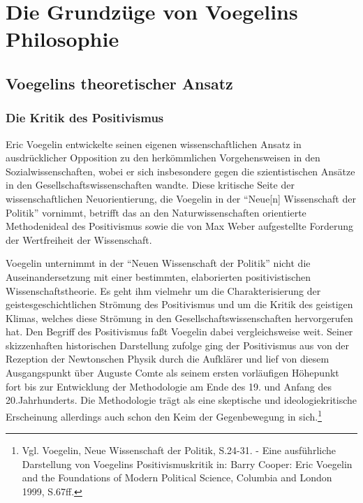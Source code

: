 

\chapter{Die Grundzüge von Voegelins Philosophie}

\section{Voegelins theoretischer Ansatz}

\subsection{Die Kritik des Positivismus}

Eric Voegelin entwickelte seinen eigenen wissenschaftlichen Ansatz in
ausdrücklicher Opposition zu den herkömmlichen Vorgehensweisen in den
Sozialwissenschaften, wobei er sich insbesondere gegen die szientistischen
Ansätze in den Gesellschaftswissenschaften wandte. Diese kritische Seite der
wissenschaftlichen Neuorientierung, die Voegelin in der "`Neue[n] Wissenschaft
der Politik"' vornimmt, betrifft das an den Naturwissenschaften orientierte
Methodenideal des Positivismus sowie die von Max Weber aufgestellte Forderung
der Wertfreiheit der Wissenschaft.

Voegelin unternimmt in der "`Neuen Wissenschaft der Politik"' nicht die
Auseinandersetzung mit einer bestimmten, elaborierten positivistischen
Wissenschaftstheorie. Es geht ihm vielmehr um die Charakterisierung der
geistesgeschichtlichen Strömung des Positivismus und um die Kritik des
geistigen Klimas, welches diese Strömung in den Gesellschaftswissenschaften
hervorgerufen hat. Den Begriff des Positivismus faßt Voegelin dabei
vergleichsweise weit. Seiner skizzenhaften historischen Darstellung zufolge
ging der Positivismus aus von der Rezeption der Newtonschen Physik durch die
Aufklärer und lief von diesem Ausgangspunkt über Auguste Comte als seinem
ersten vorläufigen Höhepunkt fort bis zur Entwicklung der Methodologie am Ende
des 19. und Anfang des 20.Jahrhunderts. Die Methodologie trägt als eine
skeptische und ideologiekritische Erscheinung allerdings auch schon den Keim
der Gegenbewegung in sich.\footnote{Vgl. Voegelin, Neue Wissenschaft der
  Politik, S.24-31. - Eine ausführliche Darstellung von Voegelins
  Positivismuskritik in: Barry Cooper: Eric Voegelin and the Foundations of
  Modern Political Science, Columbia and London 1999, S.67ff.}
  
